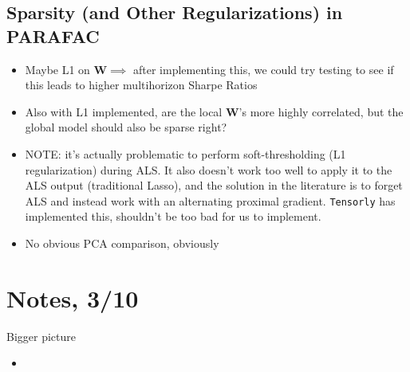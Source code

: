 \documentclass{article}
\begin{document}
\subsection{Sparsity (and Other Regularizations) in PARAFAC}
\begin{itemize}
    \item Maybe L1 on $\bm{W} \implies$ after implementing this, we could try testing to see if this leads to higher multihorizon Sharpe Ratios 
    \item Also with L1 implemented, are the local $\bm{W}$'s more highly correlated, but the global model should also be sparse right?
    \item NOTE: it's actually problematic to perform soft-thresholding (L1 regularization) during ALS. It also doesn't work too well to 
    apply it to the ALS output (traditional Lasso), and the solution in the literature is to forget ALS and instead work with 
    an alternating proximal gradient. \verb|Tensorly| has implemented this, shouldn't be too bad for us to implement. 
    \item No obvious PCA comparison, obviously
\end{itemize}

\section{Notes, 3/10}

Bigger picture
\begin{itemize}
    \item 
\end{itemize}
\end{document}
